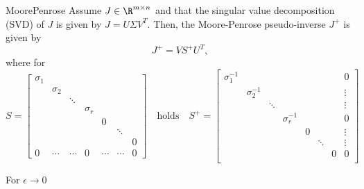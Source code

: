 \begin{theo}{MoorePenrose}
    Assume $J \in \R^{m \times n}$ and that the singular value decomposition (SVD) of $J$ is given by $J = U \Sigma V^T$. Then, the Moore-Penrose pseudo-inverse $J^+$ is given by
    \begin{equation*}
        J^+ = V S^+ U^T,
    \end{equation*}
    where for
    \begin{equation*}
    S = 
        \left[
        \begin{array}{ccccccc}
        \sigma_1 &  &  &  &  &  \\
         & \sigma_2 &  &  &  &  \\
         &  & \ddots &  &  & \\
         &  &  & \sigma_r &  & \\
         &  &  &  & 0 & & \\
         &  &  &  & & \ddots & \\
         &  &  &  & & & 0 \\
        \hline
        0 & \cdots & \cdots & 0 & \cdots & \cdots & 0
        \end{array}
        \right]
    \quad \text{holds} \quad
    S^+ = 
        \left[
        \begin{array}{ccccccc|c}
            \sigma_1^{-1} &  &  &  &  & & & 0\\
            & \sigma_2^{-1} &  &  &  & &  & \vdots \\
            &  & \ddots &  &  & & & \vdots \\
            &  &  & \sigma_r^{-1} & & & & 0\\
            &  &  &  & 0 & & & \vdots\\
            &  &  &  & & \ddots &  & \vdots\\
            &  &  &  & & & 0 & 0\\
        \end{array}
        \right]
    \end{equation*}
\end{theo}

\begin{lem}
    For $\epsilon \rightarrow 0$
\end{lem}